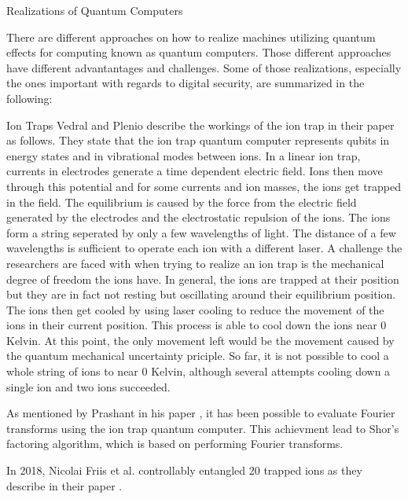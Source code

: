 \documentclass[aps,preprintnumbers,twocolumn]{revtex4}
\begin{document}
\begin{section}{Realizations of Quantum Computers}

There are different approaches on how to realize machines utilizing quantum effects for computing known as quantum computers.
Those different approaches have different advantantages and challenges. 
Some of those realizations, especially the ones important with regards to digital security, 
are summarized in the following:

\begin{subsection}{Ion Traps}
Vedral and Plenio describe the workings of the ion trap in their paper \cite[p.12-13]{2008} as follows. 
They state that the ion trap quantum computer represents qubits in energy states and in vibrational modes between ions. 
In a linear ion trap, currents in electrodes generate a time dependent electric field. 
Ions then move through this potential and for some currents and ion masses, the ions get trapped in the field. 
The equilibrium is caused by the force from the electric field generated by the electrodes and the electrostatic repulsion of the ions. 
The ions form a string seperated by only a few wavelengths of light. 
The distance of a few wavelengths is sufficient to operate each ion with a different laser. 
A challenge the researchers are faced with when trying to realize an ion trap is the mechanical degree of freedom the ions have. 
In general, the ions are trapped at their position but they are in fact not resting but oscillating around their equilibrium position. 
The ions then get cooled by using laser cooling to reduce the movement of the ions in their current position. 
This process is able to cool down the ions near 0 Kelvin. 
At this point, the only movement left would be the movement caused by the quantum mechanical uncertainty priciple. 
So far, it is not possible to cool a whole string of ions to near 0 Kelvin, 
although several attempts cooling down a single ion and two ions succeeded. 

As mentioned by Prashant in his paper \cite[p.20]{prashant}, it has been possible to evaluate Fourier transforms using the ion trap quantum computer.
This achievment lead to Shor's factoring algorithm, 
which is based on performing Fourier transforms.

In 2018, Nicolai Friis et al. controllably entangled 20 trapped ions as they describe in their paper \cite{friis}.
\end{subsection}


\end{section}
\end{document}
